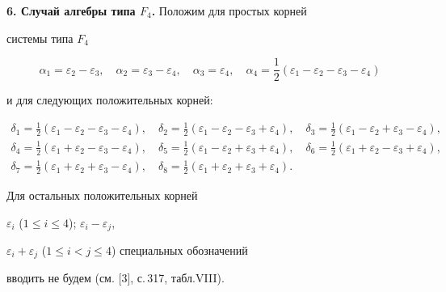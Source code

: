 {\bf 6. Случай алгебры типа $F_4$.} Положим для простых корней


системы типа $F_4$


$$


\alpha_1=\varepsilon_2-\varepsilon_3,\quad \alpha_2=\varepsilon_3-


\varepsilon_4,\quad \alpha_3=\varepsilon_4,\quad \alpha_4=


\frac12(\varepsilon_1-\varepsilon_2-\varepsilon_3-\varepsilon_4)


$$


и для следующих положительных корней:


\begin{gather*}


\delta_1=\frac12(\varepsilon_1-\varepsilon_2-\varepsilon_3-\varepsilon_4),


\quad


\delta_2=\frac12(\varepsilon_1-\varepsilon_2-\varepsilon_3+\varepsilon_4),


\quad


\delta_3=\frac12(\varepsilon_1-\varepsilon_2+\varepsilon_3-\varepsilon_4),


\\


\delta_4=\frac12(\varepsilon_1+\varepsilon_2-\varepsilon_3-\varepsilon_4),


\quad


\delta_5=\frac12(\varepsilon_1-\varepsilon_2+\varepsilon_3+\varepsilon_4),


\quad


\delta_6=\frac12(\varepsilon_1+\varepsilon_2-\varepsilon_3+\varepsilon_4),


\\


\delta_7=\frac12(\varepsilon_1+\varepsilon_2+\varepsilon_3-\varepsilon_4),


\quad


\delta_8=\frac12(\varepsilon_1+\varepsilon_2+\varepsilon_3+\varepsilon_4).


\end{gather*}


Для остальных положительных корней


$\varepsilon_i$ ($1\le i\le 4$); $\varepsilon_i-\varepsilon_j$,


$\varepsilon_i+\varepsilon_j$ ($1\le i<j\le 4$) специальных обозначений


вводить не будем (см. [3], с.\,317, табл.\;VIII).





